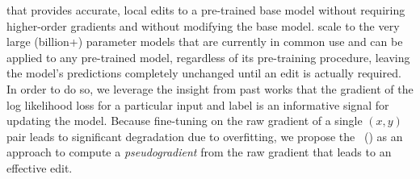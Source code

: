  that provides accurate, local edits to a pre-trained base model without requiring higher-order gradients and without modifying the base model.  scale to the very large (billion+) parameter models that are currently in common use and can be applied to any pre-trained model, regardless of its pre-training procedure, leaving the model's predictions completely unchanged until an edit is actually required. In order to do so, we leverage the insight from past works that the gradient of the log likelihood loss for a particular input and label is an informative signal for updating the model. Because fine-tuning on the raw gradient of a single $(x,y)$ pair leads to significant degradation due to overfitting, we propose the \name~(\sname) as an approach to compute a \textit{pseudogradient} from the raw gradient that leads to an effective edit.

